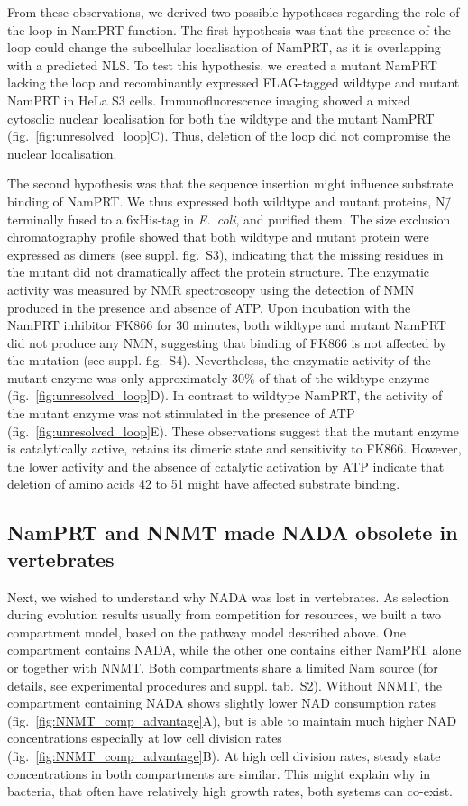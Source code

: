 From these observations, we derived two possible hypotheses regarding the role of the loop in NamPRT function. The first hypothesis was that the presence of the loop could change the subcellular localisation of NamPRT, as it is overlapping with a predicted NLS. To test this hypothesis, we created a mutant NamPRT lacking the loop and recombinantly expressed FLAG-tagged wildtype and mutant NamPRT in HeLa S3 cells. Immunofluorescence imaging showed a mixed cytosolic nuclear localisation for both the wildtype and the mutant NamPRT (fig.~\ref{fig:unresolved_loop}C). Thus, deletion of the loop did not compromise the nuclear localisation.

The second hypothesis was that the sequence insertion might influence substrate binding of NamPRT. We thus expressed both wildtype and mutant proteins, N\=/terminally fused to a 6xHis-tag in \textit{E.~coli}, and purified them. The size exclusion chromatography profile showed that both wildtype and mutant protein were expressed as dimers (see suppl. fig.~S3), indicating that the missing residues in the mutant did not dramatically affect the protein structure. The enzymatic activity was measured by NMR spectroscopy using the detection of NMN produced in the presence and absence of ATP. Upon incubation with the NamPRT inhibitor FK866 \citep{Hasmann2003} for 30 minutes, both wildtype and mutant NamPRT did not produce any NMN, suggesting that binding of FK866 is not affected by the mutation (see suppl. fig.~S4). Nevertheless, the enzymatic activity of the mutant enzyme was only approximately 30\% of that of the wildtype enzyme (fig.~\ref{fig:unresolved_loop}D). In contrast to wildtype NamPRT, the activity of the mutant enzyme was not stimulated in the presence of ATP (fig.~\ref{fig:unresolved_loop}E). These observations suggest that the mutant enzyme is catalytically active, retains its dimeric state and sensitivity to FK866. However, the lower activity and the absence of catalytic activation by ATP indicate that deletion of amino acids 42 to 51 might have affected substrate binding.


\subsection{NamPRT and NNMT made NADA obsolete in vertebrates}

Next, we wished to understand why NADA was lost in vertebrates. As selection during evolution results usually from competition for resources, we built a two compartment model, based on the pathway model described above. One compartment contains NADA, while the other one contains either NamPRT alone or together with NNMT. Both compartments share a limited Nam source (for details, see experimental procedures and suppl. tab.~S2). Without NNMT, the compartment containing NADA shows slightly lower NAD consumption rates (fig.~\ref{fig:NNMT_comp_advantage}A), but is able to maintain much higher NAD concentrations especially at low cell division rates (fig.~\ref{fig:NNMT_comp_advantage}B). At high cell division rates, steady state concentrations in both compartments are similar. This might explain why in bacteria, that often have relatively high growth rates, both systems can co-exist.

